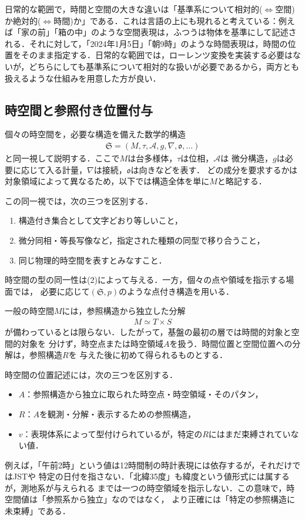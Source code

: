 \documentclass[../../main-detail.tex]{subfiles}
\begin{document}
日常的な範囲で，時間と空間の大きな違いは「基準系について相対的($\Leftrightarrow$空間)か絶対的($\Leftrightarrow$時間)か」である．これは言語の上にも現れると考えている：例えば「家の前」「箱の中」のような空間表現は，ふつうは物体を基準にして記述される．それに対して，「2024年1月5日」「朝9時」のような時間表現は，時間の位置をそのまま指定する．日常的な範囲では，ローレンツ変換を実装する必要はないが，どちらにしても基準系について相対的な扱いが必要であるから，両方とも扱えるような仕組みを用意した方が良い．

\subsection{時空間と参照付き位置付与}

個々の時空間を，必要な構造を備えた数学的構造
\begin{align*}
    \mathfrak{S}
    =
    (M,\tau,\mathcal{A},g,\nabla,\mathfrak{o},\ldots)
\end{align*}
と同一視して説明する．ここで$M$は台多様体，$\tau$は位相，$\mathcal{A}$は
微分構造，$g$は必要に応じて入る計量，$\nabla$は接続，$\mathfrak{o}$は向きなどを表す．
どの成分を要求するかは対象領域によって異なるため，以下では構造全体を単に$M$と略記する．

この同一視では，次の三つを区別する．
\begin{enumerate}
    \item 構造付き集合として文字どおり等しいこと，
    \item 微分同相・等長写像など，指定された種類の同型で移り合うこと，
    \item 同じ物理的時空間を表すとみなすこと．
\end{enumerate}
時空間の型の同一性は(2)によって与える．一方，個々の点や領域を指示する場面では，
必要に応じて$(\mathfrak{S},p)$のような点付き構造を用いる．

一般の時空間$M$には，参照構造から独立した分解
\begin{align*}
    M\simeq T\times S
\end{align*}
が備わっているとは限らない．したがって，基盤の最初の層では時間的対象と空間的対象を
分けず，時空点または時空領域$A$を扱う．時間位置と空間位置への分解は，参照構造$R$を
与えた後に初めて得られるものとする．

時空間の位置記述には，次の三つを区別する．
\begin{itemize}
    \item $A$：参照構造から独立に取られた時空点・時空領域・そのパタン，
    \item $R$：$A$を観測・分解・表示するための参照構造，
    \item $v$：表現体系によって型付けられているが，特定の$R$にはまだ束縛されていない値．
\end{itemize}
例えば，「午前2時」という値は12時間制の時計表現には依存するが，それだけではJSTや
特定の日付を指さない．「北緯35度」も緯度という値形式には属するが，測地系が与えられる
までは一つの時空領域を指示しない．この意味で，時空間値は「参照系から独立」なのではなく，
より正確には「特定の参照構造に未束縛」である．
\end{document}
